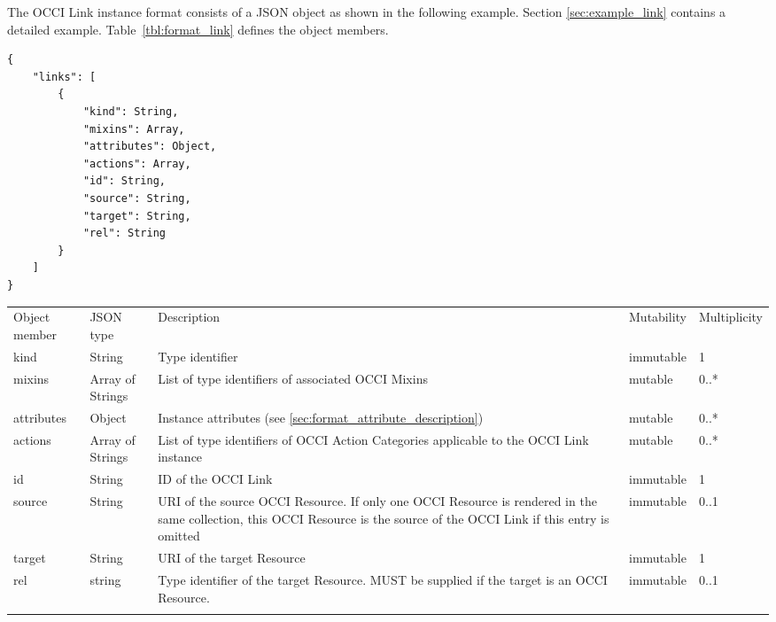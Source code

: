 \documentclass[10pt,a4paper]{article}
\begin{document}
The OCCI Link instance format consists of a JSON object as shown in the
following example. Section \ref{sec:example_link} contains a detailed example.
Table~\ref{tbl:format_link} defines the object members.
\begin{lstlisting}
{
    "links": [
        {
            "kind": String,
            "mixins": Array,
            "attributes": Object,
            "actions": Array,
            "id": String,
            "source": String,
            "target": String,
            "rel": String
        }
    ]
}
\end{lstlisting}
 {
    \begin{tabularx}{\textwidth}{llXll}
    \toprule
    Object member & JSON type & Description & Mutability & Multiplicity \\
    \colrule
    kind & String & Type identifier & immutable & 1 \\

    mixins & Array of Strings & List of type identifiers of associated OCCI
Mixins &
    mutable & 0..* \\

    attributes & Object & Instance attributes (see
\ref{sec:format_attribute_description}) & mutable & 0..* \\
    
    actions & Array of Strings & List of type identifiers of OCCI
Action Categories applicable to the OCCI Link instance & mutable & 0..* \\
    
    id & String & ID of the OCCI Link & immutable & 1\\
        
    source & String & URI of the source OCCI Resource. If only one OCCI 
Resource is rendered in the same collection, this OCCI Resource is the 
source of the OCCI Link if this entry is omitted & immutable & 0..1\\
    
    target & String & URI of the target Resource & immutable & 1\\
         
    rel & string & Type identifier of the target Resource. MUST be supplied if
the target is an OCCI Resource. & immutable & 0..1 \\
    \botrule
    \end{tabularx}
}
\end{document}
